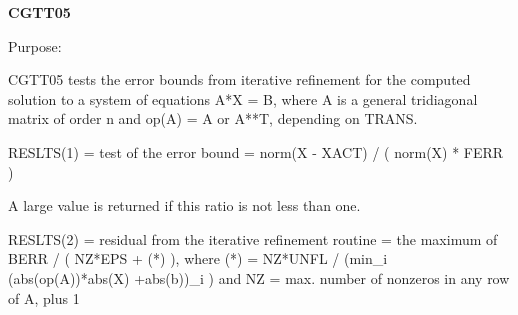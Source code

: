 {\bfseries C\+G\+T\+T05} 

\begin{DoxyParagraph}{Purpose\+: }
\begin{DoxyVerb} CGTT05 tests the error bounds from iterative refinement for the
 computed solution to a system of equations A*X = B, where A is a
 general tridiagonal matrix of order n and op(A) = A or A**T,
 depending on TRANS.

 RESLTS(1) = test of the error bound
           = norm(X - XACT) / ( norm(X) * FERR )

 A large value is returned if this ratio is not less than one.

 RESLTS(2) = residual from the iterative refinement routine
           = the maximum of BERR / ( NZ*EPS + (*) ), where
             (*) = NZ*UNFL / (min_i (abs(op(A))*abs(X) +abs(b))_i )
             and NZ = max. number of nonzeros in any row of A, plus 1\end{DoxyVerb}
 
\end{DoxyParagraph}

